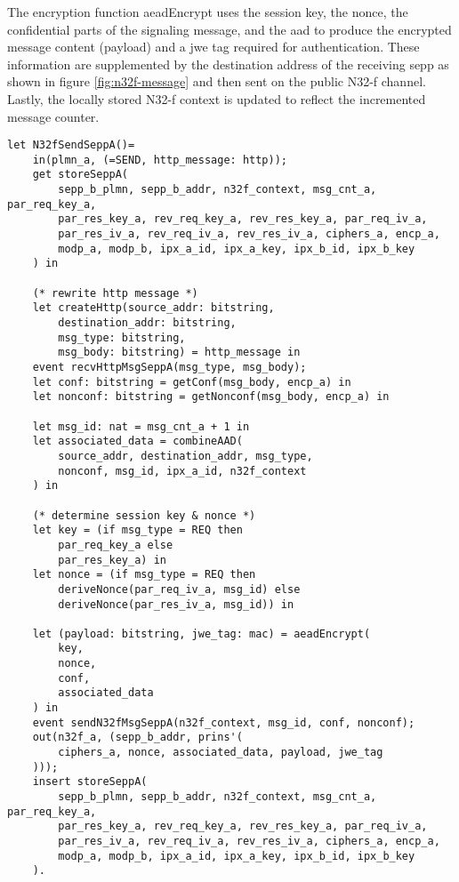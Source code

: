 The encryption function {\sffamily aeadEncrypt} uses the session key, the nonce, the confidential parts of the signaling message, and the \gls{aad} to produce the encrypted message content ({\sffamily payload}) and a \gls{jwe} tag required for authentication.
These information are supplemented by the destination address of the receiving \gls{sepp} as shown in figure \ref{fig:n32f-message} and then sent on the public N32-f channel.
Lastly, the locally stored N32-f context is updated to reflect the incremented message counter.

\begin{lstlisting}[caption={Definition of the sending N32-f signaling transmission process},label={lst:n32f-send},firstnumber=784]
let N32fSendSeppA()=
    in(plmn_a, (=SEND, http_message: http));
    get storeSeppA(
        sepp_b_plmn, sepp_b_addr, n32f_context, msg_cnt_a, par_req_key_a,
        par_res_key_a, rev_req_key_a, rev_res_key_a, par_req_iv_a,
        par_res_iv_a, rev_req_iv_a, rev_res_iv_a, ciphers_a, encp_a,
        modp_a, modp_b, ipx_a_id, ipx_a_key, ipx_b_id, ipx_b_key
    ) in

    (* rewrite http message *)
    let createHttp(source_addr: bitstring,
        destination_addr: bitstring,
        msg_type: bitstring,
        msg_body: bitstring) = http_message in
    event recvHttpMsgSeppA(msg_type, msg_body);
    let conf: bitstring = getConf(msg_body, encp_a) in
    let nonconf: bitstring = getNonconf(msg_body, encp_a) in

    let msg_id: nat = msg_cnt_a + 1 in
    let associated_data = combineAAD(
        source_addr, destination_addr, msg_type,
        nonconf, msg_id, ipx_a_id, n32f_context
    ) in

    (* determine session key & nonce *)
    let key = (if msg_type = REQ then
        par_req_key_a else
        par_res_key_a) in
    let nonce = (if msg_type = REQ then
        deriveNonce(par_req_iv_a, msg_id) else
        deriveNonce(par_res_iv_a, msg_id)) in

    let (payload: bitstring, jwe_tag: mac) = aeadEncrypt(
        key,
        nonce,
        conf,
        associated_data
    ) in
    event sendN32fMsgSeppA(n32f_context, msg_id, conf, nonconf);
    out(n32f_a, (sepp_b_addr, prins'(
        ciphers_a, nonce, associated_data, payload, jwe_tag
    )));
    insert storeSeppA(
        sepp_b_plmn, sepp_b_addr, n32f_context, msg_cnt_a, par_req_key_a,
        par_res_key_a, rev_req_key_a, rev_res_key_a, par_req_iv_a,
        par_res_iv_a, rev_req_iv_a, rev_res_iv_a, ciphers_a, encp_a,
        modp_a, modp_b, ipx_a_id, ipx_a_key, ipx_b_id, ipx_b_key
    ).
\end{lstlisting}

